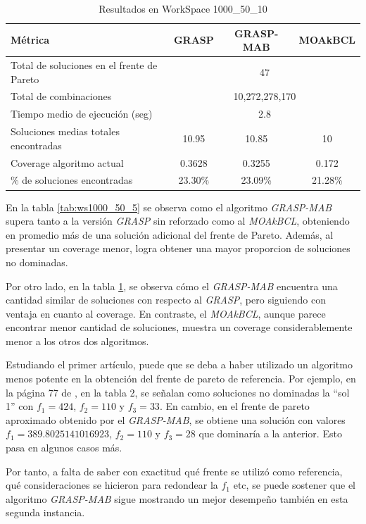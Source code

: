 \documentclass[12pt,a4paper]{book}
\begin{document}
\begin{table}[H]
\centering
\caption{Resultados en WorkSpace 1000\_50\_10}
\label{tab:ws1000_50_10}
\begin{tabular}{|l|c|c|c|}
\hline
\textbf{Métrica} & \textbf{GRASP} & \textbf{GRASP-MAB} & \textbf{MOAkBCL} \\ \hline
Total de soluciones en el frente de Pareto 
    & \multicolumn{3}{c|}{47} \\ \hline
Total de combinaciones 
    & \multicolumn{3}{c|}{10,272,278,170} \\ \hline
Tiempo medio de ejecución (seg) 
    & \multicolumn{3}{c|}{2.8} \\ \hline
Soluciones medias totales encontradas & 10.95 & 10.85 & 10 \\ \hline
Coverage algoritmo actual & 0.3628 & 0.3255 & 0.172 \\ \hline
\% de soluciones encontradas & 23.30\% & 23.09\% & 21.28\% \\ \hline
\end{tabular}
\end{table}

En la tabla \ref{tab:ws1000_50_5} se observa como el algoritmo \textit{GRASP-MAB} supera tanto a la versión \textit{GRASP} sin reforzado como al \textit{MOAkBCL}, obteniendo en promedio más de una solución adicional del frente de Pareto.
Además, al presentar un coverage menor, logra obtener una mayor proporcion de soluciones no dominadas.

Por otro lado, en la tabla \ref{tab:ws1000_50_10}, se observa cómo el \textit{GRASP-MAB} encuentra una cantidad similar de soluciones con respecto al \textit{GRASP}, pero siguiendo con ventaja en cuanto al coverage.
En contraste, el \textit{MOAkBCL}, aunque parece encontrar menor cantidad de soluciones, muestra un coverage considerablemente menor a los otros dos algoritmos. 

Estudiando el primer artículo, puede que se deba a haber utilizado un algoritmo menos potente en la obtención del frente de pareto de referencia. Por ejemplo, en la página 77 de \cite{k-balanced_1}, en la tabla 2,
se señalan como soluciones no dominadas la ``sol 1'' con $f_1=424$, $f_2=110$ y $f_3=33$. En cambio, en el frente de pareto aproximado obtenido por el \textit{GRASP-MAB}, se obtiene una solución con valores $f_1=389.8025141016923$, $f_2=110$ y $f_3=28$ que dominaría a la anterior. Esto
pasa en algunos casos más.

Por tanto, a falta de saber con exactitud qué frente se utilizó como referencia, qué consideraciones se hicieron para redondear la $f_1$ etc, se puede sostener
que el algoritmo \textit{GRASP-MAB} sigue mostrando un mejor desempeño también en esta segunda instancia.
\end{document}
